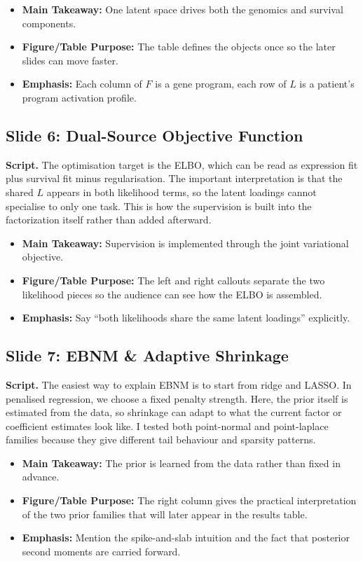 \documentclass[11pt]{article}
\newcommand{\sectionlabel}[1]{\textbf{#1}}
\begin{document}
\begin{itemize}
\item \sectionlabel{Main Takeaway:} One latent space drives both the genomics and survival components.
\item \sectionlabel{Figure/Table Purpose:} The table defines the objects once so the later slides can move faster.
\item \sectionlabel{Emphasis:} Each column of $F$ is a gene program, each row of $L$ is a patient’s program activation profile.
\end{itemize}

\subsection*{Slide 6: Dual-Source Objective Function}
\textbf{Script.} The optimisation target is the ELBO, which can be read as expression fit plus survival fit minus regularisation. The important interpretation is that the shared $L$ appears in both likelihood terms, so the latent loadings cannot specialise to only one task. This is how the supervision is built into the factorization itself rather than added afterward.

\begin{itemize}
\item \sectionlabel{Main Takeaway:} Supervision is implemented through the joint variational objective.
\item \sectionlabel{Figure/Table Purpose:} The left and right callouts separate the two likelihood pieces so the audience can see how the ELBO is assembled.
\item \sectionlabel{Emphasis:} Say ``both likelihoods share the same latent loadings'' explicitly.
\end{itemize}

\subsection*{Slide 7: EBNM \& Adaptive Shrinkage}
\textbf{Script.} The easiest way to explain EBNM is to start from ridge and LASSO. In penalised regression, we choose a fixed penalty strength. Here, the prior itself is estimated from the data, so shrinkage can adapt to what the current factor or coefficient estimates look like. I tested both point-normal and point-laplace families because they give different tail behaviour and sparsity patterns.

\begin{itemize}
\item \sectionlabel{Main Takeaway:} The prior is learned from the data rather than fixed in advance.
\item \sectionlabel{Figure/Table Purpose:} The right column gives the practical interpretation of the two prior families that will later appear in the results table.
\item \sectionlabel{Emphasis:} Mention the spike-and-slab intuition and the fact that posterior second moments are carried forward.
\end{itemize}
\end{document}
